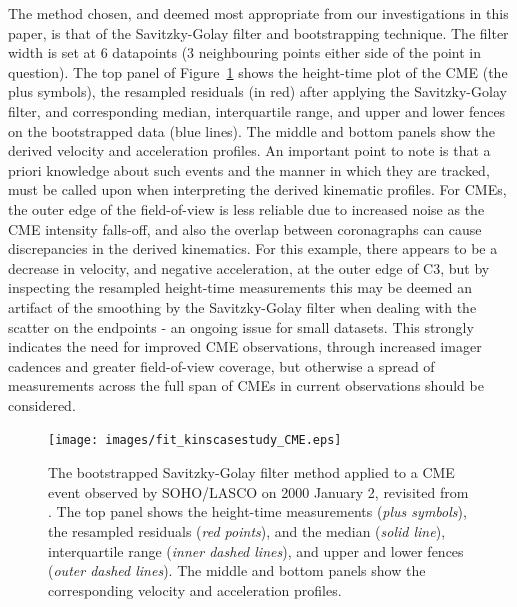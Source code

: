 \documentclass[structabstract]{aa}
\begin{document}
The method chosen, and deemed most appropriate from our investigations in this paper, is that of the Savitzky-Golay filter and bootstrapping technique. The filter width is set at 6 datapoints (3 neighbouring points either side of the point in question). The top panel of Figure~\ref{fig_savgol_CME} shows the height-time plot of the CME (the plus symbols), the resampled residuals (in red) after applying the Savitzky-Golay filter, and corresponding median, interquartile range, and upper and lower fences on the bootstrapped data (blue lines). The middle and bottom panels show the derived velocity and acceleration profiles. An important point to note is that a priori knowledge about such events and the manner in which they are tracked, must be called upon when interpreting the derived kinematic profiles. For CMEs, the outer edge of the field-of-view is less reliable due to increased noise as the CME intensity falls-off, and also the overlap between coronagraphs can cause discrepancies in the derived kinematics. For this example, there appears to be a decrease in velocity, and negative acceleration, at the outer edge of C3, but by inspecting the resampled height-time measurements this may be deemed an artifact of the smoothing by the Savitzky-Golay filter when dealing with the scatter on the endpoints - an ongoing issue for small datasets. This strongly indicates the need for improved CME observations, through increased imager cadences and greater field-of-view coverage, but otherwise a spread of measurements across the full span of CMEs in current observations should be considered.


\begin{figure}
\centering
\texttt{[image: images/fit\_kinscasestudy\_CME.eps]}
\caption{The bootstrapped Savitzky-Golay filter method applied to a CME event observed by SOHO/LASCO on 2000 January 2, revisited from \citet{2009A&A...495..325B}. The top panel shows the height-time measurements (\emph{plus symbols}), the resampled residuals (\emph{red points}), and the median (\emph{solid line}), interquartile range (\emph{inner dashed lines}), and upper and lower fences (\emph{outer dashed lines}). The middle and bottom panels show the corresponding velocity and acceleration profiles.}
\label{fig_savgol_CME}
\end{figure}
\end{document}
